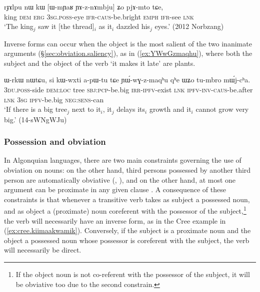\begin{exe}
\ex \label{ex:WmYaR.YAznAmbju}
\gll  rɟɤlpu nɯ kɯ [ɯ-mɲaʁ ɲɤ-z-nɤmbju] ʑo pjɤ-mto tɕe,  \\
  king \textsc{dem} \textsc{erg} \textsc{3sg}.\textsc{poss}-eye \textsc{ifr}-\textsc{caus}-be.bright \textsc{emph} \textsc{ifr}-see \textsc{lnk} \\
\glt `The king$_j$ saw it [the thread]$_i$ as it$_i$ dazzled his$_j$ eyes.'  (2012 Norbzang)
\end{exe}

Inverse forms can occur when the object is the most salient of the two inanimate arguments (§\ref{sec:obviation.saliency}), as in (\ref{ex:YWwGzmaqhu}), where both the subject and the object of the verb  `it makes it late' are plants.

\begin{exe}
\ex \label{ex:YWwGzmaqhu}
\gll ɯ-rkɯ nɯtɕu, si kɯ-wxti a-pɯ-tu tɕe ɲɯ́-wɣ-z-maqʰu qʰe ɯʑo tu-mbro mɯ́j-cʰa.	\\
\textsc{3du}.\textsc{poss}-side \textsc{dem}:\textsc{loc} tree \textsc{sbj}:\textsc{pcp}-be.big \textsc{irr}-\textsc{ipfv}-exist \textsc{lnk} \textsc{ipfv}-\textsc{inv}-\textsc{caus}-be.after \textsc{lnk} \textsc{3sg} \textsc{ipfv}-be.big \textsc{neg}:\textsc{sens}-can \\
\glt `If there is a big tree$_j$ next to it$_i$, it$_j$ delays its$_i$ growth and it$_i$ cannot grow very big.' (14-sWNgWJu)
\end{exe}
  
  
\subsubsection{Possession and obviation} \label{sec:obviation.possessor}
 
In Algonquian languages, there are two main constraints governing the use of obviation on nouns: on the other hand, third persons possessed by another third person are automatically obviative (\citealt[25]{wolfart73}, \citealt[625]{valentine01grammar}), and on the other hand, at most one argument can be proximate in any given clause  \citep[627]{valentine01grammar}. A consequence of these constraints is that whenever a transitive verb takes as subject a possessed noun, and as object a (proximate) noun coreferent with the possessor of the subject,\footnote{If the object noun is not co-referent with the possessor of the subject, it will be obviative too due to the second constrain. } the verb will necessarily have an inverse form, as in the Cree example in (\ref{ex:cree.kiimaakwamik}). Conversely, if the subject is a proximate noun and the object a possessed noun whose possessor is coreferent with the subject, the verb will necessarily be direct.

